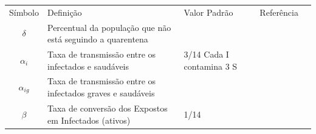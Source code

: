 \documentclass[12pt,letterpaper]{article}
\begin{document}
\begin{table}[h]
	\begin{tabular}{|c|p{10cm}|p{4cm}|l|l}
		\cline{1-4}
		Símbolo       & Definição                                                                            & Valor Padrão             & Referência &   \\ \cline{1-4}
		$\delta$       & Percentual da população que não está seguindo a quarentena                         &                           &             &   \\ \cline{1-4}
		$\alpha_i$     & Taxa de transmissão entre os infectados e saudáveis                                  & 3/14 Cada I contamina 3 S &             &   \\ \cline{1-4}
		$\alpha_{ig}$  & Taxa de transmissão entre os infectados graves e saudáveis                           &                           &             &   \\ \cline{1-4}
		$\beta$        & Taxa de conversão dos Expostos em Infectados (ativos)                                 & 1/14                      &             &   \\ \cline{1-4}
																												

\end{tabular}
\end{table}
\end{document}
